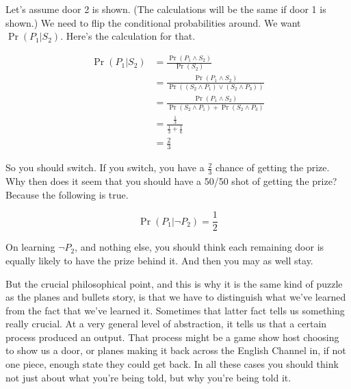 \documentclass[11pt,]{article}
\begin{document}
Let's assume door 2 is shown. (The calculations will be the same if door
1 is shown.) We need to flip the conditional probabilities around. We
want \(\Pr(P_1 | S_2)\). Here's the calculation for that.

\begin{align*}
\Pr(P_1 | S_2) &= \frac{\Pr(P_1 \wedge S_2)}{\Pr(S_2)} \\
 &= \frac{\Pr(P_1 \wedge S_2)}{\Pr((S_2 \wedge P_1) \vee (S_2 \wedge P_3))} \\
 &= \frac{\Pr(P_1 \wedge S_2)}{\Pr(S_2 \wedge P_1) + \Pr(S_2 \wedge P_3)} \\
 &= \frac{\frac{1}{3}}{\frac{1}{3} + \frac{1}{6}} \\
 &= \frac{2}{3}
\end{align*}

So you should switch. If you switch, you have a \(\frac{2}{3}\) chance
of getting the prize. Why then does it seem that you should have a 50/50
shot of getting the prize? Because the following is true.

\[
\Pr(P_1 | \neg P_2) = \frac{1}{2}
\]

On learning \(\neg P_2\), and nothing else, you should think each
remaining door is equally likely to have the prize behind it. And then
you may as well stay.

But the crucial philosophical point, and this is why it is the same kind
of puzzle as the planes and bullets story, is that we have to
distinguish what we've learned from the fact that we've learned it.
Sometimes that latter fact tells us something really crucial. At a very
general level of abstraction, it tells us that a certain process
produced an output. That process might be a game show host choosing to
show us a door, or planes making it back across the English Channel in,
if not one piece, enough state they could get back. In all these cases
you should think not just about what you're being told, but why you're
being told it.
\end{document}
